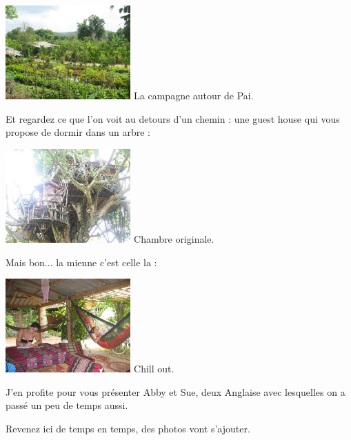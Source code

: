 \begin{multicols}{2}
\hspace*{-0.65cm}
\includegraphics[width=4.8cm]{articles/Pai/1214286138yJBp.jpg}
La campagne autour de Pai.

Et regardez ce que l'on voit au detours d'un chemin : une guest house qui vous propose de dormir dans un arbre :

\hspace*{-0.65cm}
\includegraphics[width=4.8cm]{articles/Pai/1214471897bdDK.jpg}
Chambre originale.

Mais bon... la mienne c'est celle la :

\hspace*{-0.65cm}
\includegraphics[width=4.8cm]{articles/Pai/1214471886LoCS.jpg}
Chill out.

J'en profite pour vous présenter Abby et Sue, deux Anglaise avec lesquelles on a passé un peu de temps aussi.

Revenez ici de temps en temps, des photos vont s'ajouter.

\end{multicols}


